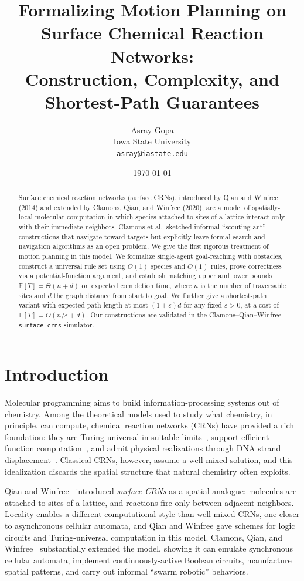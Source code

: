 \documentclass[11pt]{article}
\title{Formalizing Motion Planning on Surface Chemical Reaction Networks: \\
Construction, Complexity, and Shortest-Path Guarantees}
\author{Asray Gopa \\ \small Iowa State University \\ \small \texttt{asray@iastate.edu}}
\date{\today}
\theoremstyle{plain}
\theoremstyle{definition}
\theoremstyle{remark}
\newcommand{\E}{\mathbb{E}}
\begin{document}
\maketitle

\begin{abstract}
Surface chemical reaction networks (surface CRNs), introduced by Qian and Winfree (2014) and extended by Clamons, Qian, and Winfree (2020), are a model of spatially-local molecular computation in which species attached to sites of a lattice interact only with their immediate neighbors. Clamons et al.\ sketched informal ``scouting ant'' constructions that navigate toward targets but explicitly leave formal search and navigation algorithms as an open problem. We give the first rigorous treatment of motion planning in this model. We formalize single-agent goal-reaching with obstacles, construct a universal rule set using $O(1)$ species and $O(1)$ rules, prove correctness via a potential-function argument, and establish matching upper and lower bounds $\E[T] = \Theta(n + d)$ on expected completion time, where $n$ is the number of traversable sites and $d$ the graph distance from start to goal. We further give a shortest-path variant with expected path length at most $(1+\varepsilon)d$ for any fixed $\varepsilon > 0$, at a cost of $\E[T] = O(n/\varepsilon + d)$. Our constructions are validated in the Clamons--Qian--Winfree \texttt{surface\_crns} simulator.
\end{abstract}

\section{Introduction}
\label{sec:intro}

Molecular programming aims to build information-processing systems out of chemistry. Among the theoretical models used to study what chemistry, in principle, can compute, chemical reaction networks (CRNs) have provided a rich foundation: they are Turing-universal in suitable limits~\cite{soloveichik2008}, support efficient function computation~\cite{chen2014}, and admit physical realizations through DNA strand displacement~\cite{soloveichik2010}. Classical CRNs, however, assume a well-mixed solution, and this idealization discards the spatial structure that natural chemistry often exploits.

Qian and Winfree~\cite{qian2014} introduced \emph{surface CRNs} as a spatial analogue: molecules are attached to sites of a lattice, and reactions fire only between adjacent neighbors. Locality enables a different computational style than well-mixed CRNs, one closer to asynchronous cellular automata, and Qian and Winfree gave schemes for logic circuits and Turing-universal computation in this model. Clamons, Qian, and Winfree~\cite{clamons2020} substantially extended the model, showing it can emulate synchronous cellular automata, implement continuously-active Boolean circuits, manufacture spatial patterns, and carry out informal ``swarm robotic'' behaviors.
\end{document}
